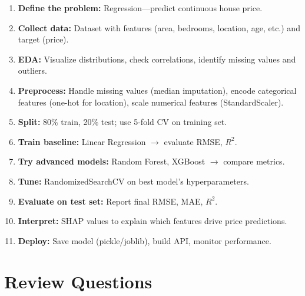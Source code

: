 \documentclass[11pt,a4paper]{article}
\begin{document}
\begin{conceptbox}
\begin{enumerate}[leftmargin=*, itemsep=2pt]
  \item \textbf{Define the problem:} Regression---predict continuous house price.
  \item \textbf{Collect data:} Dataset with features (area, bedrooms, location, age, etc.) and target (price).
  \item \textbf{EDA:} Visualize distributions, check correlations, identify missing values and outliers.
  \item \textbf{Preprocess:} Handle missing values (median imputation), encode categorical features (one-hot for location), scale numerical features (StandardScaler).
  \item \textbf{Split:} 80\% train, 20\% test; use 5-fold CV on training set.
  \item \textbf{Train baseline:} Linear Regression $\rightarrow$ evaluate RMSE, $R^2$.
  \item \textbf{Try advanced models:} Random Forest, XGBoost $\rightarrow$ compare metrics.
  \item \textbf{Tune:} RandomizedSearchCV on best model's hyperparameters.
  \item \textbf{Evaluate on test set:} Report final RMSE, MAE, $R^2$.
  \item \textbf{Interpret:} SHAP values to explain which features drive price predictions.
  \item \textbf{Deploy:} Save model (pickle/joblib), build API, monitor performance.
\end{enumerate}
\end{conceptbox}

\section{Review Questions}
\end{document}
